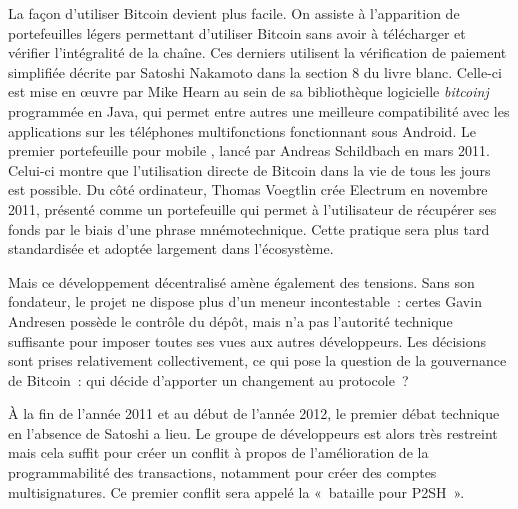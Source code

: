
La façon d'utiliser Bitcoin devient plus facile. On assiste à l'apparition de portefeuilles légers permettant d'utiliser Bitcoin sans avoir à télécharger et vérifier l'intégralité de la chaîne. Ces derniers utilisent la vérification de paiement simplifiée décrite par Satoshi Nakamoto dans la section 8 du livre blanc. Celle-ci est mise en œuvre par Mike Hearn au sein de sa bibliothèque logicielle \emph{bitcoinj} programmée en Java, qui permet entre autres une meilleure compatibilité avec les applications sur les téléphones multifonctions fonctionnant sous Android. Le premier portefeuille pour mobile , lancé par Andreas Schildbach en mars 2011. Celui-ci montre que l'utilisation directe de Bitcoin dans la vie de tous les jours est possible. Du côté ordinateur, Thomas Voegtlin crée Electrum en novembre 2011, présenté comme un portefeuille qui permet à l'utilisateur de récupérer ses fonds par le biais d'une phrase mnémotechnique. Cette pratique sera plus tard standardisée et adoptée largement dans l'écosystème.


Mais ce développement décentralisé amène également des tensions. Sans son fondateur, le projet ne dispose plus d'un meneur incontestable~: certes Gavin Andresen possède le contrôle du dépôt, mais n'a pas l'autorité technique suffisante pour imposer toutes ses vues aux autres développeurs. Les décisions sont prises relativement collectivement, ce qui pose la question de la gouvernance de Bitcoin~: qui décide d'apporter un changement au protocole~?

À la fin de l'année 2011 et au début de l'année 2012, le premier débat technique en l'absence de Satoshi a lieu. Le groupe de développeurs est alors très restreint mais cela suffit pour créer un conflit à propos de l'amélioration de la programmabilité des transactions, notamment pour créer des comptes multisignatures. Ce premier conflit sera appelé la «~bataille pour P2SH~».

